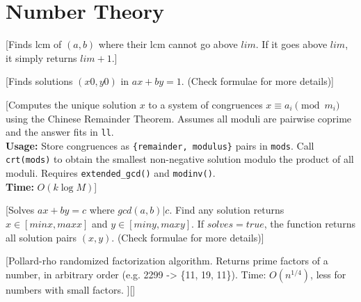 \chapter{Number Theory}





[Finds lcm of $(a,b)$ where their lcm cannot go above $lim$. 
If it goes above $lim$, it simply returns $lim+1$.]

[Finds solutions $(x0, y0)$ in $ax+by = 1$. (Check formulae for more details)]

[Computes the unique solution $x$ to a system of congruences $x \equiv a_i \pmod{m_i}$ using the Chinese Remainder Theorem. Assumes all moduli are pairwise coprime and the answer fits in \texttt{ll}. \\
\textbf{Usage:} Store congruences as \texttt{\{remainder, modulus\}} pairs in \texttt{mods}. Call \texttt{crt(mods)} to obtain the smallest non-negative solution modulo the product of all moduli. Requires \texttt{extended\_gcd()} and \texttt{modinv()}. \\
\textbf{Time:} {$O(k \log M)$}]

[Solves $ax+by = c$ where $gcd(a,b) | c$. Find any solution returns $x \in [minx, maxx]$ and $y \in [miny, maxy]$. If $solves=true$, 
the function returns all solution pairs $(x,y)$. (Check formulae for more details)]


[Pollard-rho randomized factorization algorithm. Returns prime
 factors of a number, in arbitrary order (e.g. 2299 -> \{11, 19, 11\}).
 Time: $O(n^{1/4})$, less for numbers with small factors.
][]